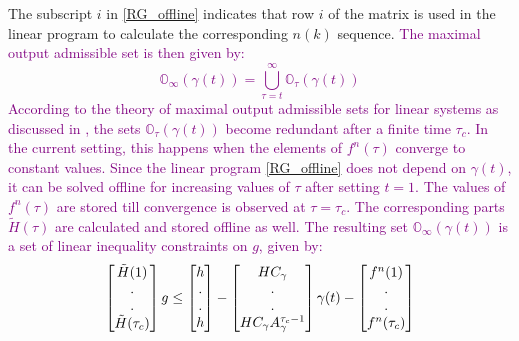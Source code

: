 \documentclass[letterpaper, 10 pt, conference]{ieeeconf}  %
\begin{document}
	The subscript $i$ in \eqref{RG_offline} indicates that row $i$ of the matrix is used in the linear program to calculate the corresponding $n(k)$ sequence. \textcolor{purple}{The maximal output admissible set is then given by:
	\begin{equation}
	\mathbb{O}_{\infty}(\gamma(t)) = \bigcup\limits_{\tau=t}^{\infty}\mathbb{O}_{\tau}(\gamma(t))
	\end{equation}
	 According to the theory of maximal output admissible sets for linear systems as discussed in \cite{83532}, the sets $\mathbb{O}_{\tau}(\gamma(t))$ become redundant after a finite time $\tau_c$. In the current setting, this happens when the elements of $f^n(\tau)$ converge to constant values.
	 Since the linear program \eqref{RG_offline} does not depend on $\gamma(t)$, it can be solved offline for increasing values of $\tau$ after setting $t=1$. The values of $f^n(\tau)$ are stored till convergence is observed at $\tau = \tau_c$. The corresponding parts $\tilde{H}(\tau)$ are calculated and stored offline as well. The resulting set $\mathbb{O}_{\infty}(\gamma(t))$ is a set of linear inequality constraints on $g$, given by:
	 \begin{equation}
	 \begin{bmatrix}
	 \tilde{H}(1) \vspace{0.001cm} \\
	 . \vspace{0.001cm} \\
	 . \vspace{0.001cm} \\
	 \tilde{H}(\tau_c)
	 \end{bmatrix} g \leq
	 \begin{bmatrix}
	 h \vspace{0.001cm} \\
	 . \vspace{0.001cm} \\
	 . \vspace{0.001cm} \\
	 h
	 \end{bmatrix} - 
	 \begin{bmatrix}
	 HC_{\gamma} \vspace{0.001cm} \\
	 . \vspace{0.001cm} \\
	 . \vspace{0.001cm} \\
	 HC_{\gamma}A_{\gamma}^{\tau_c - 1}
	 \end{bmatrix}\gamma(t) - 
	 \begin{bmatrix}
	 f^n(1) \vspace{0.001cm} \\
	 . \vspace{0.001cm} \\
	 . \vspace{0.001cm} \\
	 f^n(\tau_c)
	 \end{bmatrix}
	 \label{MOAS}
	 \end{equation}}
\end{document}
